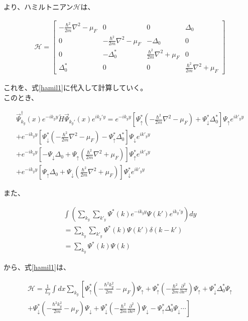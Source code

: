 \documentclass{jsarticle}
\begin{document}
		より、ハミルトニアン$\mathcal{H}$は、

		\begin{align}
			\mathcal{H}=
			\begin{bmatrix}
				-\frac{\hbar^2}{2m}\nabla^2-\mu_F & 0 & 0 & \Delta_0 \\
				0 & -\frac{\hbar^2}{2m}\nabla^2-\mu_F & -\Delta_0 & 0 \\
				0 & -\Delta_0^\ast & \frac{\hbar^2}{2m}\nabla^2+\mu_F & 0 \\
				\Delta_0^\ast & 0 & 0 & \frac{\hbar^2}{2m}\nabla^2+\mu_F
			\end{bmatrix}
		\end{align}

		これを、式\eqref{hamil1}に代入して計算していく。　\\
		このとき、

		\begin{align}
			\vec{\Psi}_{k_y}^\dagger(x) e^{-ik_yy} \tilde{H}  \vec{\Psi}_{k_y'}(x) e^{ik_y'y} =
			e^{-ik_yy} \left[ \Psi_\uparrow^\ast \left( -\frac{\hbar^2}{2m}\nabla^2-\mu_F \right) +\Psi_\downarrow^\ast \Delta_0^\ast \right] \Psi_\uparrow e^{ik'_yy} \nonumber\\
			+e^{-ik_yy} \left[ \Psi_\downarrow^\ast \left( -\frac{\hbar^2}{2m}\nabla^2-\mu_F \right) -\Psi_\uparrow^\ast \Delta_0^\ast \right] \Psi_\downarrow e^{ik'_yy} \nonumber\\
			+ e^{-ik_yy} \left[ -\Psi_\downarrow\Delta_0 +\Psi_\uparrow \left( \frac{\hbar^2}{2m}\nabla^2+\mu_F \right) \right] \Psi_\uparrow^\ast e^{ik'_yy} \nonumber\\
			+e^{-ik_yy} \left[ \Psi_\uparrow\Delta_0 +\Psi_\downarrow \left( \frac{\hbar^2}{2m}\nabla^2+\mu_F \right) \right] \Psi_\downarrow^\ast e^{ik'_yy}
		\end{align}

		また、
		
		\begin{align}
		\int \left( \sum_{k_y}\sum_{k'_y}\Psi^\ast(k) e^{-ik_yy}\Psi(k')e^{ik_y'y} \right) dy \nonumber \\
		=\sum_{k_y}\sum_{k'_y}\Psi^\ast(k) \Psi(k')\delta \left( k-k' \right) \nonumber \\
		=\sum_{k_y}\Psi^\ast(k)\Psi(k)
		\end{align}
		

		から、式\eqref{hamil1}は、

		\begin{align}
			\mathcal{H}= \frac{1}{L_y}\int dx \sum_{k_y}
			\left[ \Psi_\uparrow^\ast \left( -\frac{\hbar^2k_y^2}{2m}-\mu_F \right)\Psi_\uparrow
			+\Psi_\uparrow^\ast \left(- \frac{\hbar^2}{2m}\frac{\partial^2}{\partial x^2}\right)\Psi_\uparrow
			+\Psi_\downarrow^\ast \Delta_0^\ast \Psi_\uparrow \right. \nonumber \\ \left.+
			\Psi_\downarrow^\ast \left( -\frac{\hbar^2k_y^2}{2m}-\mu_F \right)\Psi_\downarrow
			+\Psi_\downarrow^\ast \left(- \frac{\hbar^2}{2m}\frac{\partial^2}{\partial x^2} \right) \Psi_\downarrow
			-\Psi_\uparrow^\ast \Delta_0^\ast \Psi_\downarrow \cdots
			\right]
			\label{hamil2}
		\end{align}
\end{document}
